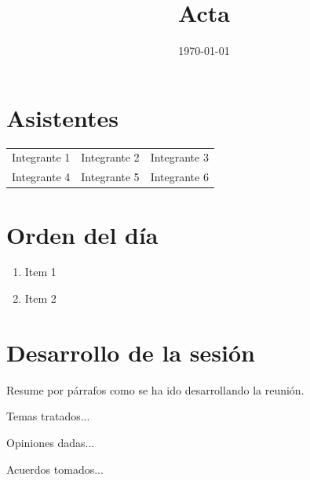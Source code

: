 \documentclass[letterpaper]{article}
\title{Acta}
\date{\today}
\begin{document}
\maketitle
\thispagestyle{fancy}



\section{Asistentes}
\begin{table}[H]
\begin{tabular}{lll}

Integrante 1 & Integrante 2 & Integrante 3 \\
Integrante 4 & Integrante 5 & Integrante 6 
\end{tabular}
\end{table}


\section{Orden del día}
	\begin{enumerate}
		\item Item 1
        \item Item 2
	\end{enumerate}

\section{Desarrollo de la sesión}

Resume por párrafos como se ha ido desarrollando la reunión.

Temas tratados...

Opiniones dadas...

Acuerdos tomados...
\end{document}
